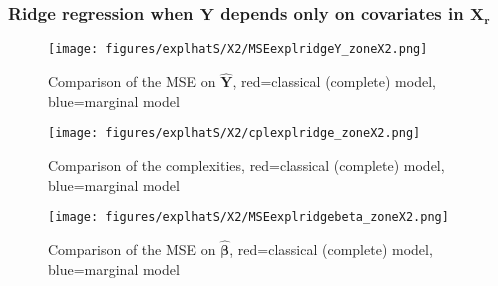 \documentclass[12pt,a4paper]{report}
\begin{document}
\subsubsection{Ridge regression when $\boldsymbol{Y}$ depends only on covariates in $\boldsymbol{X_r}$}

\begin{figure}[h!]
	\centering
		  \texttt{[image: figures/explhatS/X2/MSEexplridgeY\_zoneX2.png]}
		\caption{Comparison of the MSE on $\hat{\boldsymbol{Y}}$, red=classical (complete) model, blue=marginal model}\label{MSEexplridgeY_zoneX2}
	\end{figure}
	\begin{figure}[h!]
	\centering
		  \texttt{[image: figures/explhatS/X2/cplexplridge\_zoneX2.png]}
		\caption{Comparison of the complexities, red=classical (complete) model, blue=marginal model}\label{cplexplridge_zoneX2}
	\end{figure}
	\begin{figure}[h!]
	\centering
		  \texttt{[image: figures/explhatS/X2/MSEexplridgebeta\_zoneX2.png]}
		\caption{Comparison of the MSE on $\hat{\boldsymbol{\beta}}$, red=classical (complete) model, blue=marginal model}\label{MSEexplridgebeta_zoneX2}
	\end{figure}
	\FloatBarrier
\end{document}
